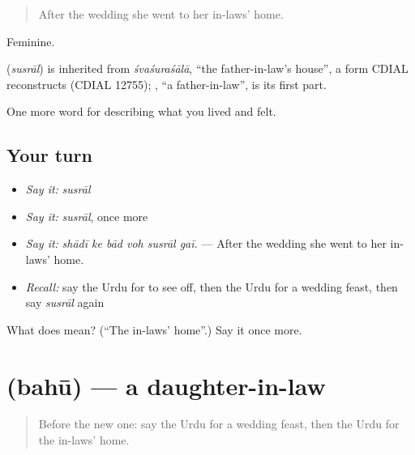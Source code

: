 \begin{quote}
After the wedding she went to her in-laws' home.
\end{quote}

Feminine.

\begin{cousinweb}
\textbf{} (\emph{susrāl}) is inherited from \emph{śvaśuraśālā}, \textquotedblleft{}the father-in-law's house\textquotedblright{}, a form CDIAL reconstructs (CDIAL 12755); \textbf{}, \textquotedblleft{}a father-in-law\textquotedblright{}, is its first part.
\end{cousinweb}

\begin{grammarlens}[title={What you've built}]
One more word for describing what you lived and felt.
\end{grammarlens}

\subsection*{Your turn}
\begin{itemize}
\raggedright
  \item \emph{Say it:} \emph{susrāl}
  \item \emph{Say it:} \emph{susrāl}, once more
  \item \emph{Say it:} \emph{shādī ke bād voh susrāl gaī.} — After the wedding she went to her in-laws' home.
  \item \emph{Recall:} say the Urdu for to see off, then the Urdu for a wedding feast, then say \emph{susrāl} again
\end{itemize}

\begin{tcolorbox}[breakable,colback=teal!4,colframe=teal!35!black,title={Before you move on}]
What does  mean? (\textquotedblleft{}The in-laws' home\textquotedblright{}.) Say it once more.
\end{tcolorbox}
\section[\texorpdfstring{\ur{بہو} (bahū)}{بہو (bahū)}]{ (bahū) — a daughter-in-law}

\label{lesson:UR-C488-bahu}



\begin{quote}
Before the new one: say the Urdu for a wedding feast, then the Urdu for the in-laws' home.
\end{quote}

